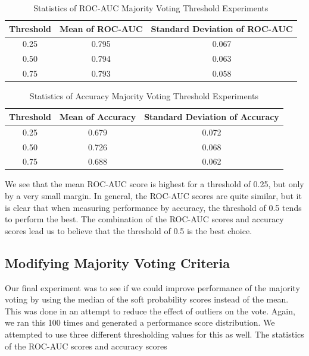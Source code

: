 \documentclass[10pt,twocolumn,letterpaper]{article}
\begin{document}
\begin{table}
  \begin{center}
    \begin{adjustbox}{width=0.47\textwidth}
    \begin{tabular}{|c|c|c|}
      \textbf{Threshold} & \textbf{Mean of ROC-AUC} & \textbf{Standard Deviation of ROC-AUC} \\
      \hline 
      0.25 & 0.795 & 0.067  \\
      0.50 & 0.794 & 0.063  \\
      0.75 & 0.793 & 0.058  \\
    \end{tabular}
    \end{adjustbox}
    \caption{Statistics of ROC-AUC Majority Voting Threshold Experiments}
    \label{tab:table2}
  \end{center}
\end{table}
\begin{table}
  \begin{center}
    \begin{adjustbox}{width=0.47\textwidth}
    \begin{tabular}{|c|c|c|}
      \textbf{Threshold} & \textbf{Mean of Accuracy} & \textbf{Standard Deviation of Accuracy} \\
      \hline 
      0.25 & 0.679 & 0.072  \\
      0.50 & 0.726 & 0.068  \\
      0.75 & 0.688 & 0.062  \\
    \end{tabular}
    \end{adjustbox}
    \caption{Statistics of Accuracy Majority Voting Threshold Experiments}
    \label{tab:table3}
  \end{center}
\end{table}

We see that the mean ROC-AUC score is highest for a threshold of 0.25, but only by a very small margin. In general, the ROC-AUC scores are quite similar, but it is clear
that when measuring performance by accuracy, the threshold of 0.5 tends to perform the best. The combination of the ROC-AUC scores and accuracy scores lead us to believe that
the threshold of 0.5 is the best choice.

\subsection{Modifying Majority Voting Criteria}
Our final experiment was to see if we could improve performance of the majority voting by using the median of the soft probability scores instead of the mean. This was done in
an attempt to reduce the effect of outliers on the vote. Again, we ran this 100 times and generated a performance score distribution. We attempted to use three different thresholding
values for this as well. The statistics of the ROC-AUC scores and accuracy scores
\end{document}
